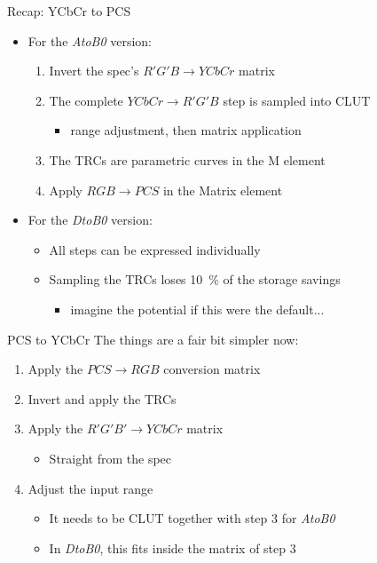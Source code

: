 \documentclass[final, aspectratio=169]{divoc}
\begin{document}
\begin{frame}{Recap: YCbCr to PCS}
  \begin{itemize}
    \item For the \emph{AtoB0} version:
          \begin{enumerate}
            \item Invert the spec's $R'G'B \rightarrow YCbCr$ matrix
            \item The complete $YCbCr \rightarrow R'G'B$ step is sampled into CLUT
                  \begin{itemize}
                    \item range adjustment, then matrix application
                  \end{itemize}
            \item The TRCs are parametric curves in the M element
            \item Apply $RGB \rightarrow PCS$ in the Matrix element
          \end{enumerate}
    \item For the \emph{DtoB0} version:
          \begin{itemize}
            \item All steps can be expressed individually 
            \item Sampling the TRCs loses \SI{10}{\percent} of the storage savings
                  \begin{itemize}
                    \item imagine the potential if this were the default... 
                  \end{itemize}
          \end{itemize}
  \end{itemize}
\end{frame}
\begin{frame}{PCS to YCbCr}
  The things are a fair bit simpler now:

  \begin{enumerate}[<+(1)->]
    \item Apply the $PCS \rightarrow RGB$  conversion matrix
    \item Invert and apply the TRCs
    \item Apply the $R'G'B' \rightarrow YCbCr$ matrix
          \begin{itemize}
            \item Straight from the spec
          \end{itemize}
    \item Adjust the input range
          \begin{itemize}
            \item It needs to be CLUT together with step 3 for \emph{AtoB0}
            \item In \emph{DtoB0}, this fits inside the matrix of step 3
          \end{itemize}
  \end{enumerate}
\end{frame}
\end{document}
